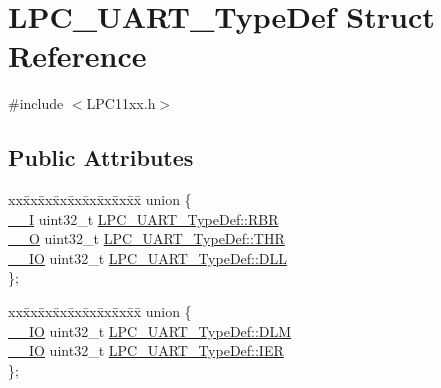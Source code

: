 \hypertarget{struct_l_p_c___u_a_r_t___type_def}{}\section{L\+P\+C\+\_\+\+U\+A\+R\+T\+\_\+\+Type\+Def Struct Reference}
\label{struct_l_p_c___u_a_r_t___type_def}


{\ttfamily \#include $<$L\+P\+C11xx.\+h$>$}

\subsection*{Public Attributes}
\begin{DoxyCompactItemize}
\item 
\begin{tabbing}
xx\=xx\=xx\=xx\=xx\=xx\=xx\=xx\=xx\=\kill
union \{\\
\>\hyperlink{group___c_m_s_i_s__core__definitions_gaf63697ed9952cc71e1225efe205f6cd3}{\_\_I} uint32\_t \hyperlink{group___l_p_c11xx___definitions_ga7f91d69f11beff3ba1c9b067cc547d18}{LPC\_UART\_TypeDef::RBR}\\
\>\hyperlink{group___c_m_s_i_s__core__definitions_ga7e25d9380f9ef903923964322e71f2f6}{\_\_O} uint32\_t \hyperlink{group___l_p_c11xx___definitions_gab3343b931a2ef5cbcfa1a24aaca8ac95}{LPC\_UART\_TypeDef::THR}\\
\>\hyperlink{group___c_m_s_i_s__core__definitions_gaec43007d9998a0a0e01faede4133d6be}{\_\_IO} uint32\_t \hyperlink{group___l_p_c11xx___definitions_ga41d5df9870fe86e6718f9a51fcc52a47}{LPC\_UART\_TypeDef::DLL}\\
\}; \\

\end{tabbing}\item 
\begin{tabbing}
xx\=xx\=xx\=xx\=xx\=xx\=xx\=xx\=xx\=\kill
union \{\\
\>\hyperlink{group___c_m_s_i_s__core__definitions_gaec43007d9998a0a0e01faede4133d6be}{\_\_IO} uint32\_t \hyperlink{group___l_p_c11xx___definitions_ga1bf0b08d8a70f114a9a440a88c461b11}{LPC\_UART\_TypeDef::DLM}\\
\>\hyperlink{group___c_m_s_i_s__core__definitions_gaec43007d9998a0a0e01faede4133d6be}{\_\_IO} uint32\_t \hyperlink{group___l_p_c11xx___definitions_gafc1b84e9e3670126ce7bc52a44cf0315}{LPC\_UART\_TypeDef::IER}\\
\}; \\


\end{tabbing}
\end{DoxyCompactItemize}
